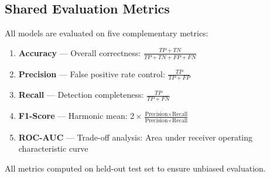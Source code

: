 \subsection{Shared Evaluation Metrics}

All models are evaluated on five complementary metrics:

\begin{enumerate}
  \item \textbf{Accuracy} --- Overall correctness: $\frac{TP + TN}{TP + TN + FP + FN}$
  
  \item \textbf{Precision} --- False positive rate control: $\frac{TP}{TP + FP}$
  
  \item \textbf{Recall} --- Detection completeness: $\frac{TP}{TP + FN}$
  
  \item \textbf{F1-Score} --- Harmonic mean: $2 \times \frac{\text{Precision} \times \text{Recall}}{\text{Precision} + \text{Recall}}$
  
  \item \textbf{ROC-AUC} --- Trade-off analysis: Area under receiver operating characteristic curve
\end{enumerate}

All metrics computed on held-out test set to ensure unbiased evaluation.

